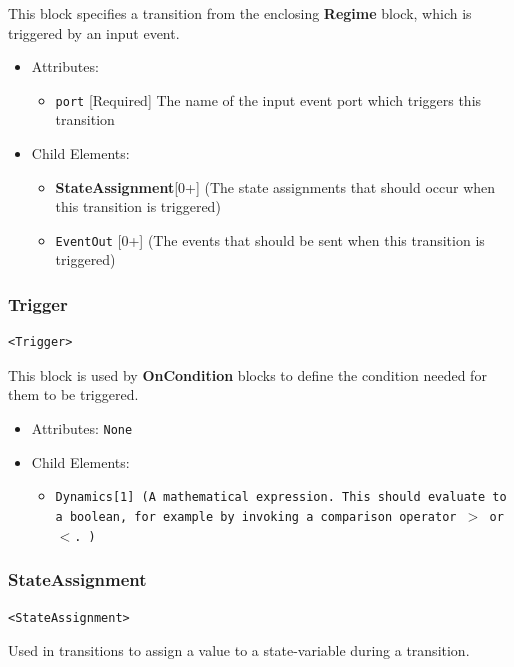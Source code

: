 \documentclass{article}
\newcommand{\MathInline}{\tt{Dynamics}}
\newcommand{\StateAssignment}{{\bf{StateAssignment}}\xspace}
\newcommand{\Regime}{{\bf{Regime}}\xspace}
\newcommand{\OnCondition}{{\bf{OnCondition}}\xspace}
\begin{document}
This block specifies a transition from the enclosing \Regime block, which is
triggered
by an input event.

\begin{itemize}
\item Attributes:
%
\begin{itemize}
\item \verb|port| {[}Required{]} The name of the input event port which triggers
this
transition
\end{itemize}

\item Child Elements:
%
\begin{itemize}
\item \StateAssignment {[}0+{]} (The state assignments that should occur when
this transition is triggered)
\item {\tt EventOut} {[}0+{]} (The events that should be sent when this
transition is triggered)
\end{itemize}
\end{itemize}

\subsubsection{Trigger}
%
\begin{lstlisting}
<Trigger>
\end{lstlisting}

This block is used by \OnCondition blocks to define the condition needed for
them to be triggered.

\begin{itemize}
\item Attributes: \texttt{None}

\item Child Elements:
%
\begin{itemize}
\item \MathInline {[}1{]} (A mathematical expression. This should evaluate to a
boolean, for example by invoking a comparison operator  $>$ or $<$. )
\end{itemize}
\end{itemize}

\subsubsection{StateAssignment}
%
\begin{lstlisting}
<StateAssignment>
\end{lstlisting}

Used in transitions to assign a value to a state-variable during a transition.
\end{document}
